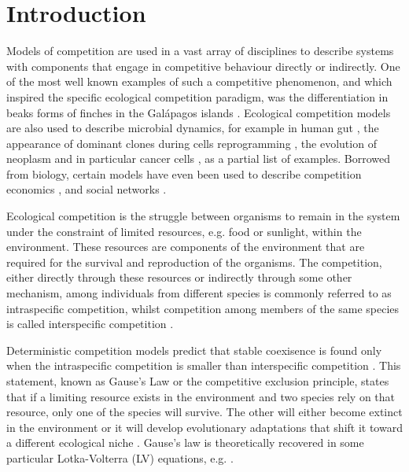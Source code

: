 \documentclass[%
 amsmath,amssymb,
reprint,%
linenumbers]{revtex4-2}
\begin{document}
\maketitle


\section{Introduction}
\label{sec:introduction}

Models of competition are used in a vast array of disciplines to describe systems with components that engage in competitive behaviour directly or indirectly. 
One of the most well known examples of such a competitive phenomenon, and which inspired the specific ecological competition paradigm, was the differentiation in beaks forms of finches in the Gal\'apagos islands \cite{lewin1983finches,lack1983darwin}. 
Ecological competition models are also used to describe microbial dynamics, for example in human gut \cite{coyte2015ecology,gorter2020understanding}, the appearance of dominant clones during cells reprogramming \cite{shakiba2019cell}, the evolution of neoplasm and in particular cancer cells \cite{merlo2006cancer,kareva2015cancer}, as a partial list of examples.
Borrowed from biology, certain models have even been used to describe competition  economics \cite{budzinski2007monoculture}, and social networks \cite{koura2017competitive}.

Ecological competition is the struggle between organisms to remain in the system under the constraint of limited resources, e.g. food or sunlight, within the environment. 
These resources are components of the environment that are required for the survival and reproduction of the organisms.
The competition, either directly through these resources or indirectly through some other mechanism, among individuals from different species is commonly referred to as intraspecific competition, whilst competition among members of the same species is called interspecific competition \cite{grover1997resource,begon2006ecology,pocheville2015ecological}. 

Deterministic competition models predict that stable coexisence is found only when the intraspecific competition is smaller than interspecific competition  \cite{hardin1960competitive,macarthur1967limiting,MacArthur1969species, gause2019struggle}.
This statement, known as Gause's Law or the competitive exclusion principle, states that if a limiting resource exists in the environment and two species rely on that resource, only one of the species will survive. %
The other will either become extinct in the environment or it will develop evolutionary adaptations that shift it toward a different ecological niche \cite{hardin1960competitive}. 
Gause’s law is theoretically recovered in some particular Lotka-Volterra (LV) equations, e.g. \cite{macarthur1967limiting,MacArthur1969species}.
\end{document}
